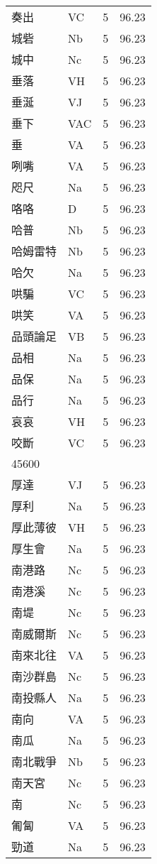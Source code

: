 \documentclass[twocolumn]{book}
\begin{document}
\begin{supertabular}{llrr}
奏出 & VC & 5 &  96.23\\
城砦 & Nb & 5 &  96.23\\
城中 & Nc & 5 &  96.23\\
垂落 & VH & 5 &  96.23\\
垂涎 & VJ & 5 &  96.23\\
垂下 & VAC & 5 &  96.23\\
垂 & VA & 5 &  96.23\\
咧嘴 & VA & 5 &  96.23\\
咫尺 & Na & 5 &  96.23\\
咯咯 & D & 5 &  96.23\\
哈普 & Nb & 5 &  96.23\\
哈姆雷特 & Nb & 5 &  96.23\\
哈欠 & Na & 5 &  96.23\\
哄騙 & VC & 5 &  96.23\\
哄笑 & VA & 5 &  96.23\\
品頭論足 & VB & 5 &  96.23\\
品相 & Na & 5 &  96.23\\
品保 & Na & 5 &  96.23\\
品行 & Na & 5 &  96.23\\
哀哀 & VH & 5 &  96.23\\
咬斷 & VC & 5 &  96.23\\
45600\\
厚達 & VJ & 5 &  96.23\\
厚利 & Na & 5 &  96.23\\
厚此薄彼 & VH & 5 &  96.23\\
厚生會 & Na & 5 &  96.23\\
南港路 & Nc & 5 &  96.23\\
南港溪 & Nc & 5 &  96.23\\
南堤 & Nc & 5 &  96.23\\
南威爾斯 & Nc & 5 &  96.23\\
南來北往 & VA & 5 &  96.23\\
南沙群島 & Nc & 5 &  96.23\\
南投縣人 & Na & 5 &  96.23\\
南向 & VA & 5 &  96.23\\
南瓜 & Na & 5 &  96.23\\
南北戰爭 & Nb & 5 &  96.23\\
南天宮 & Nc & 5 &  96.23\\
南 & Nc & 5 &  96.23\\
匍匐 & VA & 5 &  96.23\\
勁道 & Na & 5 &  96.23\\

\end{supertabular}
\end{document}
